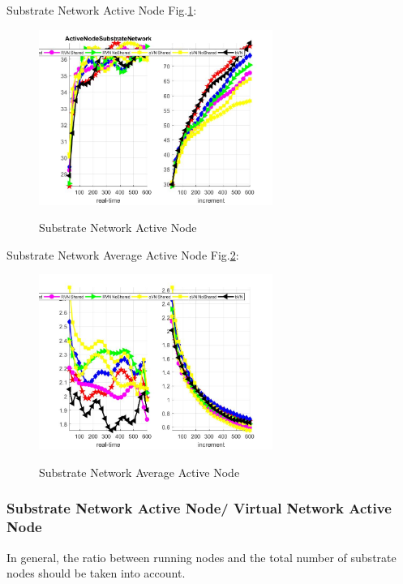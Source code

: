 Substrate Network Active Node Fig.\ref{fig:ActiveNodeSubstrateNetwork}:
\begin{figure}
  \centering
  \includegraphics[width=3in]{Fig/ActiveNodeSubstrateNetwork}\\
  \caption{Substrate Network Active Node}\label{fig:ActiveNodeSubstrateNetwork}
\end{figure}


Substrate Network Average Active Node Fig.\ref{fig:ActiveNodeAverageSubstrateNetwork}:
\begin{figure}
  \centering
  \includegraphics[width=3in]{Fig/ActiveNodeAverageSubstrateNetwork}\\
  \caption{Substrate Network Average Active Node }\label{fig:ActiveNodeAverageSubstrateNetwork}
\end{figure}

\subsubsection{Substrate Network Active Node/ Virtual Network Active Node }
In general, the ratio between running nodes and the total number of substrate nodes should be taken into account.

